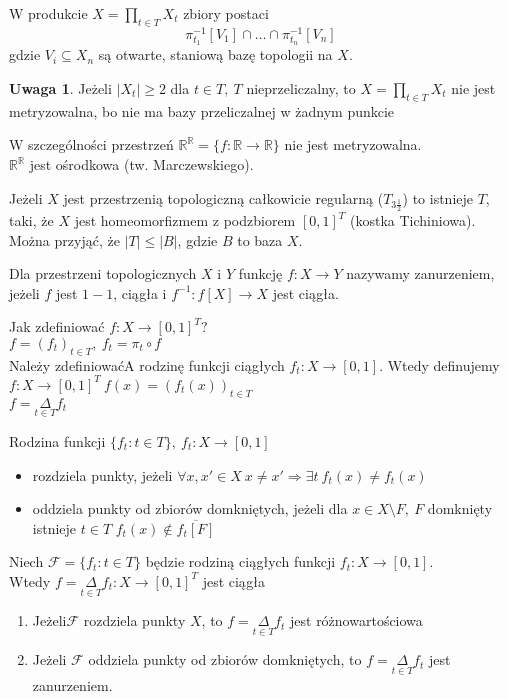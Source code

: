 \documentclass[twoside,10pt]{article}
\theoremstyle{definition}
\theoremstyle{definition}
\theoremstyle{definition}
\theoremstyle{definition}
\theoremstyle{remark}
\theoremstyle{definition}
\newtheorem*{uw}{Uwaga}
\theoremstyle{definition}
\theoremstyle{definition}
\theoremstyle{definition}
\theoremstyle{definition}
\theoremstyle{definition}
\begin{document}
\begin{tw} 
    W produkcie $X = \prod\limits_{t \in T} X_t$ zbiory postaci 
    \[ \pi_{t_1}^{-1}[V_1] \cap \ldots \cap \pi_{t_n}^{-1} [V_n] \] 
    gdzie $V_i \subseteq X_n$ są otwarte, staniową bazę topologii na $X$.
\end{tw} 
\begin{uw} 
    Jeżeli $|X_t| \ge 2$ dla $t \in T,\ T$ nieprzeliczalny, to $X = \prod\limits_{t \in T}
    X_t$ nie jest metryzowalna, bo nie ma bazy przeliczalnej w żadnym punkcie
\end{uw} 
W szczególności przestrzeń $\mathbb R ^ \mathbb R = \{ f : \mathbb R \to \mathbb R\}$ nie
jest metryzowalna. \\ 
$\mathbb R ^ \mathbb R$ jest ośrodkowa (tw. Marczewskiego).
\begin{tw} 
    Jeżeli $X$ jest przestrzenią topologiczną całkowicie regularną ($T_{3 \frac{1}{2}}$)
    to istnieje $T$, taki, że $X$ jest homeomorfizmem z podzbiorem $[0,1]^T$ (kostka
    Tichiniowa). Można przyjąć, że $|T| \le |B|$, gdzie $B$ to baza $X$.
\end{tw} 
\begin{df} 
    Dla przestrzeni topologicznych $X$ i $Y$ funkcję $f: X \to Y$ nazywamy zanurzeniem,
    jeżeli $f$ jest $1-1$, ciągła i $f^{-1}: f[X] \to X$ jest ciągła. 
\end{df} 
Jak zdefiniować $f: X \to [0,1]^T?$ \\ 
$f = (f_t)_{t \in T}, \ f_t = \pi_t \circ f$ \\ 
Należy zdefiniowaćA rodzinę funkcji ciągłych $f_t: X \to [0,1]$. Wtedy definujemy 
$f: X \to [0,1]^T \ f(x) = (f_t(x))_{t \in T}$ \\ 
$f = \underset{t \in T}{\Delta}f_t$
\begin{df} 
    Rodzina funkcji $\{f_t : t \in T\},\ f_t: X \to [0,1]$ 
    \begin{itemize} 
        \item rozdziela punkty, jeżeli $\forall x,x' \in X \ x \neq x' \Rightarrow 
            \exists t \ f_t (x) \neq f_t (x)$
        \item oddziela punkty od zbiorów domkniętych, jeżeli dla $x \in X \setminus F,\ F$
             domknięty istnieje $t \in T$ $f_t(x) \notin \overline{f_t[F]}$
    \end{itemize} 
\end{df} 
\begin{tw}["o przekątnej"] 
    Niech $\mathcal F = \{f_t: t \in T\}$ będzie rodziną ciągłych funkcji $f_t: X \to [0,1]$. \\ 
    Wtedy $f = \underset{t \in T}{\Delta} f_t: X \to [0,1]^T$ jest ciągła
    \begin{enumerate}[(1)]
        \item Jeżeli$\mathcal F$ rozdziela punkty $X$, to $f=\underset{t\in T}{\Delta}f_t$
                jest różnowartościowa
        \item Jeżeli $\mathcal F$ oddziela punkty od zbiorów domkniętych, to 
            $f = \underset{t \in T}{\Delta} f_t$ jest zanurzeniem. 
    \end{enumerate} 
\end{tw} 
\end{document}
